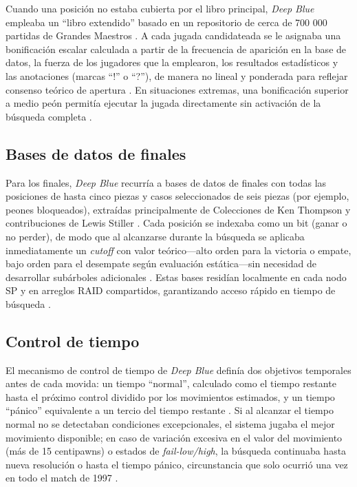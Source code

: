 \documentclass[a4paper, 12pt]{article}
\begin{document}
Cuando una posición no estaba cubierta por el libro principal, 
\textit{Deep Blue} empleaba un “libro extendido” basado en un 
repositorio de cerca de 700 000 partidas de Grandes Maestros 
\cite{Campbell2002}. A cada jugada candidateada se le asignaba 
una bonificación escalar calculada a partir de la frecuencia de 
aparición en la base de datos, la fuerza de los jugadores que la 
emplearon, los resultados estadísticos y las anotaciones 
(marcas “!” o “?”), de manera no lineal y ponderada para 
reflejar consenso teórico de apertura \cite{Campbell2002}. 
En situaciones extremas, una bonificación superior a medio 
peón permitía ejecutar la jugada directamente sin activación de 
la búsqueda completa \cite{Campbell2002}.

\subsection{Bases de datos de finales}

Para los finales, \textit{Deep Blue} recurría a bases de datos 
de finales con todas las posiciones de hasta cinco piezas y 
casos seleccionados de seis piezas (por ejemplo, peones 
bloqueados), extraídas principalmente de Colecciones de Ken 
Thompson y contribuciones de Lewis Stiller \cite{Campbell2002}. 
Cada posición se indexaba como un bit (ganar o no perder), de 
modo que al alcanzarse durante la búsqueda se aplicaba 
inmediatamente un \emph{cutoff} con valor teórico—alto orden 
para la victoria o empate, bajo orden para el desempate según 
evaluación estática—sin necesidad de desarrollar subárboles 
adicionales \cite{Campbell2002}. Estas bases residían localmente 
en cada nodo SP y en arreglos RAID compartidos, garantizando 
acceso rápido en tiempo de búsqueda \cite{Campbell2002}.

\subsection{Control de tiempo}

El mecanismo de control de tiempo de \textit{Deep Blue} definía 
dos objetivos temporales antes de cada movida: un tiempo 
“normal”, calculado como el tiempo restante hasta el próximo 
control dividido por los movimientos estimados, y un tiempo 
“pánico” equivalente a un tercio del tiempo restante 
\cite{Campbell2002}. Si al alcanzar el tiempo normal no se 
detectaban condiciones excepcionales, el sistema jugaba el mejor 
movimiento disponible; en caso de variación excesiva en el valor 
del movimiento (más de 15 centipawns) o estados de 
\emph{fail-low/high}, la búsqueda continuaba hasta nueva 
resolución o hasta el tiempo pánico, circunstancia que solo 
ocurrió una vez en todo el match de 1997 \cite{Campbell2002}.
\end{document}
